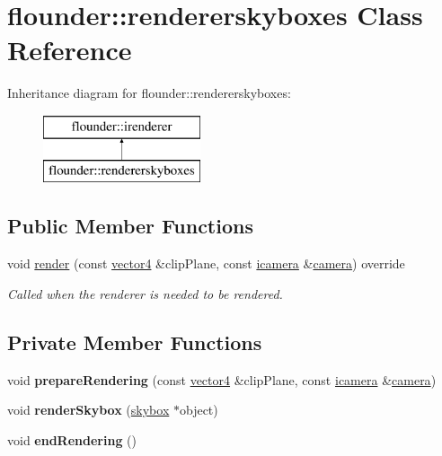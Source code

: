 \hypertarget{classflounder_1_1rendererskyboxes}{}\section{flounder\+:\+:rendererskyboxes Class Reference}
\label{classflounder_1_1rendererskyboxes}
Inheritance diagram for flounder\+:\+:rendererskyboxes\+:\begin{figure}[H]
\begin{center}
\leavevmode
\includegraphics[height=2.000000cm]{classflounder_1_1rendererskyboxes}
\end{center}
\end{figure}
\subsection*{Public Member Functions}
\begin{DoxyCompactItemize}
\item 
void \hyperlink{classflounder_1_1rendererskyboxes_a436679aedf4ea978d8683f2dfe82ecd5}{render} (const \hyperlink{classflounder_1_1vector4}{vector4} \&clip\+Plane, const \hyperlink{classflounder_1_1icamera}{icamera} \&\hyperlink{classflounder_1_1camera}{camera}) override
\begin{DoxyCompactList}\small\item\em Called when the renderer is needed to be rendered. \end{DoxyCompactList}\end{DoxyCompactItemize}
\subsection*{Private Member Functions}
\begin{DoxyCompactItemize}
\item 
\mbox{\label{classflounder_1_1rendererskyboxes_ae9baa915a124b2fb3670791b104c2a2e}} 
void {\bfseries prepare\+Rendering} (const \hyperlink{classflounder_1_1vector4}{vector4} \&clip\+Plane, const \hyperlink{classflounder_1_1icamera}{icamera} \&\hyperlink{classflounder_1_1camera}{camera})
\item 
\mbox{\label{classflounder_1_1rendererskyboxes_a64dab4b70e38782d2c7cb080657e20f1}} 
void {\bfseries render\+Skybox} (\hyperlink{classflounder_1_1skybox}{skybox} $\ast$object)
\item 
\mbox{\label{classflounder_1_1rendererskyboxes_a65be13309a60997dbec0053296971ebe}} 
void {\bfseries end\+Rendering} ()
\end{DoxyCompactItemize}
